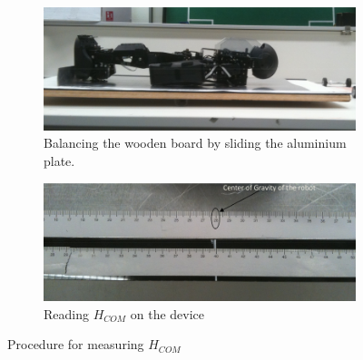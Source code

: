 {\begin{figure}
\begin{subfigure}{.45\textwidth}
    \centering
    \includegraphics[width=\textwidth]{img/com-measurement-step3}
    \caption{Balancing the wooden board by sliding the aluminium plate.}
    \label{fig:com-measurement-3}
  \end{subfigure}
  \hfill
  \begin{subfigure}{.45\textwidth}
    \centering
    \includegraphics[width=\textwidth]{img/com-measurement-step4}
    \caption{Reading $H_{COM}$ on the device}
    \label{fig:com-measurement-4}
  \end{subfigure}
  \caption{Procedure for measuring $H_{COM}$}
\end{figure}
}